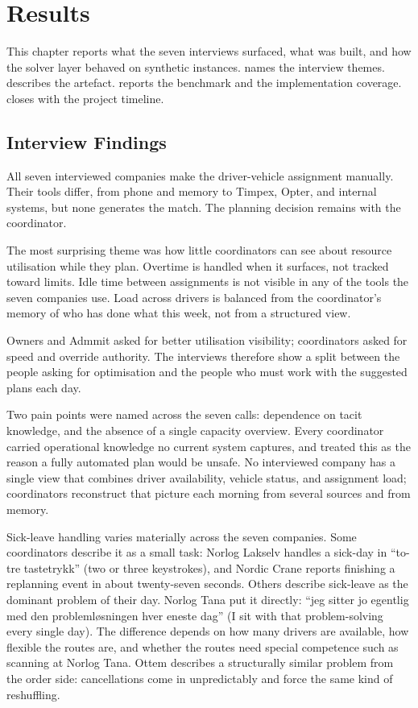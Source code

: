 \chapter{Results}
\label{chap:findings}

This chapter reports what the seven interviews surfaced, what was built, and how the solver layer behaved on synthetic instances.  names the interview themes.  describes the artefact.  reports the benchmark and the implementation coverage.  closes with the project timeline.


\section{Interview Findings}
\label{sec:interview-findings}
\label{sec:interview-themes}

All seven interviewed companies make the driver-vehicle assignment manually. Their tools differ, from phone and memory to Timpex, Opter, and internal systems, but none generates the match. The planning decision remains with the coordinator.

The most surprising theme was how little coordinators can see about resource utilisation while they plan. Overtime is handled when it surfaces, not tracked toward limits. Idle time between assignments is not visible in any of the tools the seven companies use. Load across drivers is balanced from the coordinator's memory of who has done what this week, not from a structured view.

Owners and Admmit asked for better utilisation visibility; coordinators asked for speed and override authority. The interviews therefore show a split between the people asking for optimisation and the people who must work with the suggested plans each day.

Two pain points were named across the seven calls: dependence on tacit knowledge, and the absence of a single capacity overview. Every coordinator carried operational knowledge no current system captures, and treated this as the reason a fully automated plan would be unsafe. No interviewed company has a single view that combines driver availability, vehicle status, and assignment load; coordinators reconstruct that picture each morning from several sources and from memory.

Sick-leave handling varies materially across the seven companies. Some coordinators describe it as a small task: Norlog Lakselv handles a sick-day in ``to-tre tastetrykk'' (two or three keystrokes), and Nordic Crane reports finishing a replanning event in about twenty-seven seconds. Others describe sick-leave as the dominant problem of their day. Norlog Tana put it directly: ``jeg sitter jo egentlig med den problemløsningen hver eneste dag'' (I sit with that problem-solving every single day). The difference depends on how many drivers are available, how flexible the routes are, and whether the routes need special competence such as scanning at Norlog Tana. Ottem describes a structurally similar problem from the order side: cancellations come in unpredictably and force the same kind of reshuffling.

